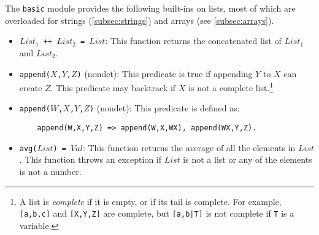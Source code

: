 The \texttt{basic} module provides the following built-ins on lists, most of which are overloaded for strings (\ref{subsec:strings}) and arrays (see \ref{subsec:arrays}).
\begin{itemize}
\item \texttt{$List_1$ ++ $List_2$ = $List$}: This function returns the concatenated list of $List_1$ and $List_2$. 
\item \texttt{append($X$,$Y$,$Z$)} (nondet): This predicate is true if appending $Y$ to $X$ can create $Z$. This predicate may backtrack if $X$ is not a complete list.\footnote{A list is \emph{complete}  if it is empty, or if its tail is complete. For example, \texttt{[a,b,c]} and \texttt{[X,Y,Z]} are complete, but \texttt{[a,b|T]} is not complete if \texttt{T} is a variable.}

\item \texttt{append($W$,$X$,$Y$,$Z$)} (nondet): This predicate is defined as:
\begin{verbatim}
    append(W,X,Y,Z) => append(W,X,WX), append(WX,Y,Z).
\end{verbatim}

\item \texttt{avg($List$) = $Val$}: This function returns the average of all the elements in $List$. This function throws an exception if $List$ is not a list or any of the elements is not a number. 


\end{itemize}
